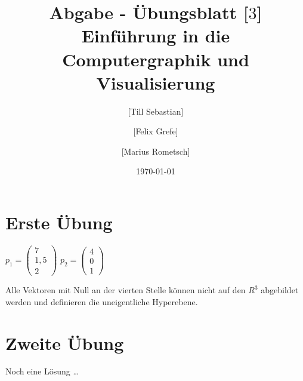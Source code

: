 \documentclass[10pt,a4paper]{article}
\begin{document}
\title{Abgabe - Übungsblatt [$3$]\\
\small{Einführung in die Computergraphik und Visualisierung}}
\author{ [Till Sebastian] \and [Felix Grefe] \and [Marius Rometsch]}
\date{\today}
\maketitle

\section*{Erste Übung}
$
p_1 =\begin{pmatrix}
	7 \\
	 1,5 \\
	 2 
\end{pmatrix}$
$
p_2 =\begin{pmatrix}
4 \\
0 \\
1 
\end{pmatrix}
$

Alle Vektoren mit Null an der vierten Stelle können nicht auf den $R^3$ abgebildet werden und definieren die uneigentliche Hyperebene.
\section*{Zweite Übung}
Noch eine Lösung \ldots
\end{document}
